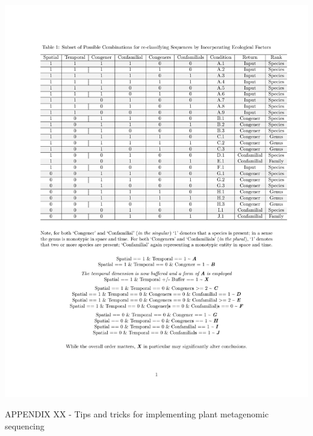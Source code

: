 \documentclass[
]{article}
\begin{document}
\includegraphics{../graphics/tables/reclassify_reads_table.pdf}

\newpage

APPENDIX XX - Tips and tricks for implementing plant metagenomic
sequencing
\end{document}
